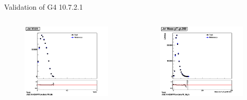 \begin{frame}{Validation of G4 10.7.2.1}
    \begin{columns}
        \begin{column}{0.5\textwidth}
            \begin{figure}
                \centering
                \includegraphics[width = \textwidth]{783_Width}
            \end{figure}
        \end{column}
        \begin{column}{0.5\textwidth}
            \begin{figure}
                \centering
                \includegraphics[width = \textwidth]{783_M_high}

\end{figure}
\end{column}
\end{columns}
\end{frame}
